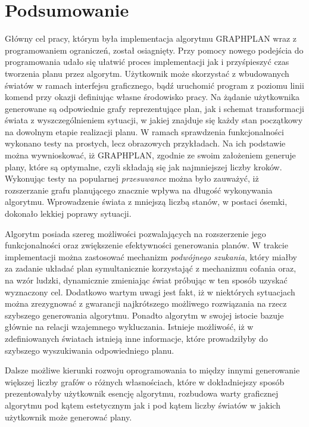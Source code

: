 \chapter*{Podsumowanie}
\thispagestyle{chapterBeginStyle}

    Główny cel pracy, którym była implementacja algorytmu GRAPHPLAN wraz z programowaniem ograniczeń, został osiagnięty. Przy pomocy 
    nowego podejścia do programowania udało się ułatwić proces implementacji jak i przyśpieszyć czas tworzenia planu przez algorytm. Użytkownik 
    może skorzystać z wbudowanych światów w ramach interfejsu graficznego, bądź uruchomić program z poziomu linii komend przy okazji 
    definiując własne środowisko pracy. Na żądanie użytkownika generowane są odpowiednie grafy reprezentujące plan, jak i schemat 
    transformacji świata z wyszczególnieniem sytuacji, w jakiej znajduje się każdy stan początkowy na dowolnym etapie realizacji planu.
    W ramach sprawdzenia funkcjonalności wykonano testy na prostych, lecz obrazowych przykładach. Na ich podstawie można wywnioskować, iż GRAPHPLAN,
    zgodnie ze swoim założeniem generuje plany, które są optymalne, czyli składają się jak najmniejszej liczby kroków. Wykonując testy na 
    popularnej \textit{przesuwance} można było zauważyć, iż rozszerzanie grafu planującego znacznie wpływa na długość wykonywania algorytmu. 
    Wprowadzenie świata z mniejszą liczbą stanów, w postaci ósemki, dokonało lekkiej poprawy sytuacji. 

    Algorytm posiada szereg możliwości pozwalających na rozszerzenie jego funkcjonalności oraz zwiększenie efektywności generowania planów. W trakcie 
    implementacji można zastosować mechanizm \textit{podwójnego szukania}, który miałby za zadanie układać plan symultanicznie korzystająć z mechanizmu 
    cofania oraz, na wzór ludzki, dynamicznie zmieniając świat próbując w ten sposób uzyskać wyznaczony cel. Dodatkowo wartym uwagi jest fakt, iż
    w niektórych sytuacjach można zrezygnować z gwarancji najkrótszego możliwego rozwiązania na rzecz szybszego generowania algorytmu. Ponadto 
    algorytm w swojej istocie bazuje głównie na relacji wzajemnego wykluczania. Istnieje możliwość, iż w zdefiniowanych światach istnieją inne informacje,
    które prowadziłyby do szybszego wyszukiwania odpowiedniego planu.

    Dalsze możliwe kierunki rozwoju oprogramowania to między innymi generowanie większej liczby grafów o różnych własnościach, które
    w dokładniejszy sposób prezentowałyby użytkownik esencję algorytmu, rozbudowa warty graficznej algorytmu pod kątem estetycznym jak i 
    pod kątem liczby światów w jakich użytkownik może generować plany.

